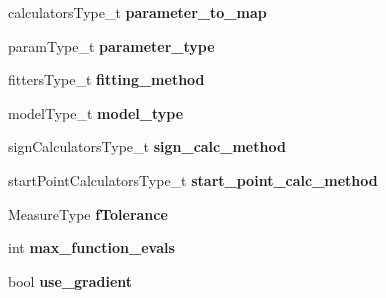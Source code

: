 \begin{DoxyCompactItemize}
\item 
calculators\+Type\+\_\+t {\bfseries parameter\+\_\+to\+\_\+map}\hypertarget{class_ox_1_1_tomato_options_a44e8de3a99f7e23d49735c0e05cd5e59}{}\label{class_ox_1_1_tomato_options_a44e8de3a99f7e23d49735c0e05cd5e59}

\item 
param\+Type\+\_\+t {\bfseries parameter\+\_\+type}\hypertarget{class_ox_1_1_tomato_options_a9f406c37d1353a310015d457ae5c35f9}{}\label{class_ox_1_1_tomato_options_a9f406c37d1353a310015d457ae5c35f9}

\item 
fitters\+Type\+\_\+t {\bfseries fitting\+\_\+method}\hypertarget{class_ox_1_1_tomato_options_a56a77fc581a4ca4760b50629e6f61ec7}{}\label{class_ox_1_1_tomato_options_a56a77fc581a4ca4760b50629e6f61ec7}

\item 
model\+Type\+\_\+t {\bfseries model\+\_\+type}\hypertarget{class_ox_1_1_tomato_options_a5a26f8c23e4de480d09f5e8d3fc34718}{}\label{class_ox_1_1_tomato_options_a5a26f8c23e4de480d09f5e8d3fc34718}

\item 
sign\+Calculators\+Type\+\_\+t {\bfseries sign\+\_\+calc\+\_\+method}\hypertarget{class_ox_1_1_tomato_options_ab77cebb869508b1c80c66ca050a5f7b3}{}\label{class_ox_1_1_tomato_options_ab77cebb869508b1c80c66ca050a5f7b3}

\item 
start\+Point\+Calculators\+Type\+\_\+t {\bfseries start\+\_\+point\+\_\+calc\+\_\+method}\hypertarget{class_ox_1_1_tomato_options_ab461d072e121f0a24a55b78ffb1ae053}{}\label{class_ox_1_1_tomato_options_ab461d072e121f0a24a55b78ffb1ae053}

\item 
Measure\+Type {\bfseries f\+Tolerance}\hypertarget{class_ox_1_1_tomato_options_a8464c2c65c7ae901a06807da2898a58a}{}\label{class_ox_1_1_tomato_options_a8464c2c65c7ae901a06807da2898a58a}

\item 
int {\bfseries max\+\_\+function\+\_\+evals}\hypertarget{class_ox_1_1_tomato_options_aebdbe09b7f518d2d25a8efaaad55fa3b}{}\label{class_ox_1_1_tomato_options_aebdbe09b7f518d2d25a8efaaad55fa3b}

\item 
bool {\bfseries use\+\_\+gradient}\hypertarget{class_ox_1_1_tomato_options_a475acd29db3834e91f102cb18dc2aae7}{}\label{class_ox_1_1_tomato_options_a475acd29db3834e91f102cb18dc2aae7}


\end{DoxyCompactItemize}
